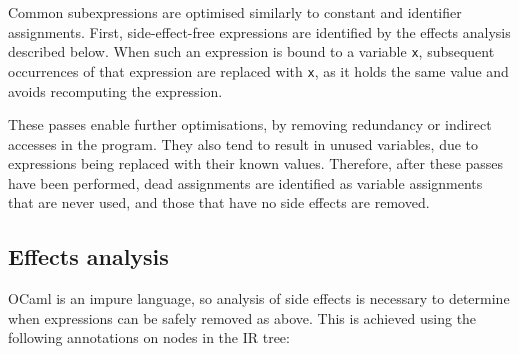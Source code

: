 
Common subexpressions are optimised similarly to constant and identifier assignments. First, side-effect-free expressions are identified by the effects analysis described below. When such an expression is bound to a variable \verb|x|, subsequent occurrences of that expression are replaced with \verb|x|, as it holds the same value and avoids recomputing the expression. 


These passes enable further optimisations, by removing redundancy or indirect accesses in the program. They also tend to result in unused variables, due to expressions being replaced with their known values.  Therefore, after these passes have been performed,  dead assignments are identified as variable assignments that are never used, and those that have no side effects are removed.



\subsection{Effects analysis}
OCaml is an impure language, so analysis of side effects is necessary to determine when expressions can be safely removed as above. This is achieved using the following annotations on nodes in the IR tree:


